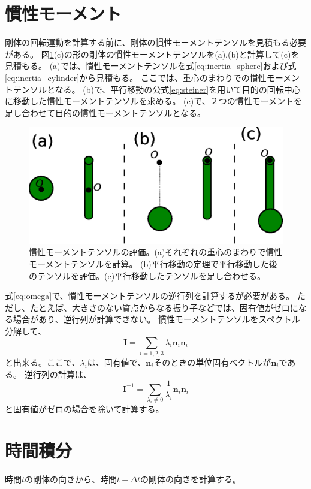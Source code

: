 \documentclass[a4paper,11pt]{jbook}
\begin{document}
 \section{慣性モーメント}
 剛体の回転運動を計算する前に、剛体の慣性モーメントテンソルを見積もる必要がある。
 図\ref{fig:4_1_inertia}(c)の形の剛体の慣性モーメントテンソルを(a),(b)と計算して(c)を見積もる。
 (a)では、慣性モーメントテンソルを式\eqref{eq:inertia_sphere}および式\eqref{eq:inertia_cylinder}から見積もる。
 ここでは、重心のまわりでの慣性モーメントテンソルとなる。
 (b)で、平行移動の公式\eqref{eq:steiner}を用いて目的の回転中心に移動した慣性モーメントテンソルを求める。
 (c)で、２つの慣性モーメントを足し合わせて目的の慣性モーメントテンソルとなる。
 \begin{figure}[h]
\centering
  \includegraphics[clip,width=0.75\linewidth]{pict/4_1_inertia.eps}
  \caption{慣性モーメントテンソルの評価。(a)それぞれの重心のまわりで慣性モーメントテンソルを計算。
  (b)平行移動の定理で平行移動した後のテンソルを評価。(c)平行移動したテンソルを足し合わせる。}
  \label{fig:4_1_inertia}
\end{figure}

式\eqref{eq:omega}で、慣性モーメントテンソルの逆行列を計算するが必要がある。
ただし、たとえば、大きさのない質点からなる振り子などでは、固有値がゼロになる場合があり、逆行列が計算できない。
慣性モーメントテンソルをスペクトル分解して、
\begin{equation}
\bm{I}=\sum_{i=1,2,3}\lambda_i\bm{n}_i\bm{n}_i
\end{equation}
と出来る。ここで、$\lambda_i$は、固有値で、$\bm{n}_i$そのときの単位固有ベクトルが$\bm{n}_i$である。
逆行列の計算は、
\begin{equation}
\bm{I}^{-1}=\sum_{\lambda_i\neq 0}\frac{1}{\lambda_i}\bm{n}_i\bm{n}_i
\end{equation}
と固有値がゼロの場合を除いて計算する。
 \section{時間積分}
 時間$t$の剛体の向きから、時間$t+\Delta t$の剛体の向きを計算する。
\end{document}
